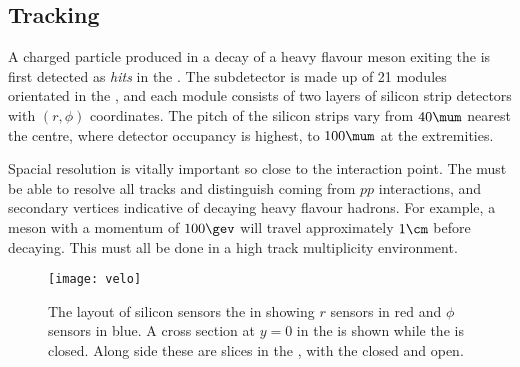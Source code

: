 \subsection{Tracking}

A charged particle produced in a decay of a heavy flavour meson exiting the \pv is first detected
as \emph{hits} in the \velo.
The \velo subdetector is made up of 21 modules orientated in the , and
each module consists of two layers of silicon strip detectors with $(r,\phi)$ coordinates.
The pitch of the silicon strips vary from \approx$40\mum$ nearest the centre, where detector occupancy
is highest, to \approx$100\mum$ at the extremities.

Spacial resolution is vitally important so close to the interaction point.
The \velo must be able to resolve all tracks and distinguish  coming from
$pp$ interactions, and secondary vertices indicative of decaying heavy flavour hadrons.
For example, a \Bp meson with a momentum of $100\gev$ will travel approximately $1\cm$ before decaying.
This must all be done in a high track multiplicity environment.



\begin{figure}
  \begin{center}
    \texttt{[image: velo]}
  \end{center}
  \caption[Diagram of the LHCb Vertex Locator]
  {
    The layout of silicon sensors the \velo in showing $r$ sensors in red and $\phi$ sensors in
    blue.
    A cross section at $y=0$ in the  is shown while the \velo is closed.
    Along side these are slices in the , with the \velo closed and open.
  }
  \label{fig:lhcb:velo}
\end{figure}





